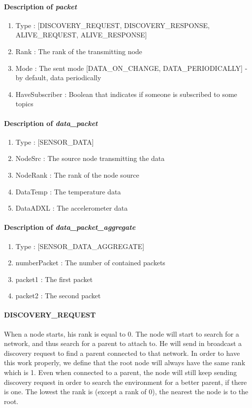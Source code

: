 \documentclass[a4paper,10pt]{article}
\begin{document}
\paragraph{Description of \textit{packet}}
\begin{enumerate}
\item Type : [DISCOVERY\_REQUEST, DISCOVERY\_RESPONSE, ALIVE\_REQUEST, ALIVE\_RESPONSE]
\item Rank : The rank of the transmitting node
\item Mode : The sent mode [DATA\_ON\_CHANGE, DATA\_PERIODICALLY] - by default, data periodically 
\item HaveSubscriber : Boolean that indicates if someone is subscribed to some topics
\end{enumerate}

\paragraph{Description of \textit{data\_packet} }
\begin{enumerate}
\item Type : [SENSOR\_DATA]
\item NodeSrc :  The source node transmitting the data
\item NodeRank : The rank of the node source
\item DataTemp : The temperature data
\item DataADXL : The accelerometer data
\end{enumerate}

\paragraph{Description of \textit{data\_packet\_aggregate} }
\begin{enumerate}
\item Type : [SENSOR\_DATA\_AGGREGATE]
\item numberPacket : The number of contained packets
\item packet1 :  The first packet
\item packet2 : The second packet
\end{enumerate}

\paragraph{DISCOVERY\_REQUEST}  When a node starts, his rank is equal to 0. The node will start to search for a network, and thus search for a parent to attach to. He will send in broadcast a discovery request to find a parent connected to that network. In order to have this work properly, we define that the root node will always have the same rank which is 1. Even when connected to a parent, the node will still keep sending discovery request in order to search the environment for a better parent, if there is one. The lowest the rank is (except a rank of 0), the nearest the node is to the root.
\end{document}
